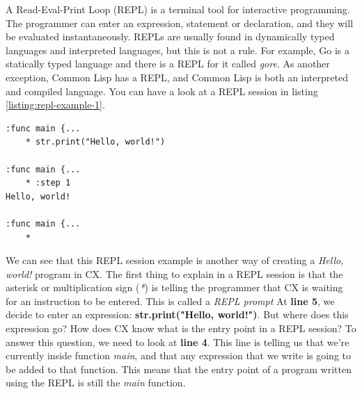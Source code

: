 \documentclass[11pt,fleqn,openany]{book} %
\begin{document}

A Read-Eval-Print Loop (REPL) is a terminal tool for interactive programming. The programmer can enter an expression, statement or declaration, and they will be evaluated instantaneously. REPLs are usually found in dynamically typed languages and interpreted languages, but this is not a rule. For example, Go is a statically typed language and there is a REPL for it called \emph{gore}. As another exception, Common Lisp has a REPL, and Common Lisp is both an interpreted and compiled language. You can have a look at a REPL session in listing \ref{listing:repl-example-1}.


\begin{lstlisting}[caption={REPL session example},captionpos=b,label={listing:repl-example-1}]
:func main {...
	* str.print("Hello, world!")

:func main {...
	* :step 1
Hello, world!

:func main {...
	* 
\end{lstlisting}

We can see that this REPL session example is another way of creating a \textit{Hello, world!} program in CX. The first thing to explain in a REPL session is that the asterisk or multiplication sign (\textit{*}) is telling the programmer that CX is waiting for an instruction to be entered. This is called a \textit{REPL prompt} At \textbf{line 5}, we decide to enter an expression: \textbf{str.print("Hello, world!")}. But where does this expression go? How does CX know what is the entry point in a REPL session? To answer this question, we need to look at \textbf{line 4}. This line is telling us that we're currently inside function \emph{main}, and that any expression that we write is going to be added to that function. This means that the entry point of a program written using the REPL is still the \textit{main} function.
\end{document}
